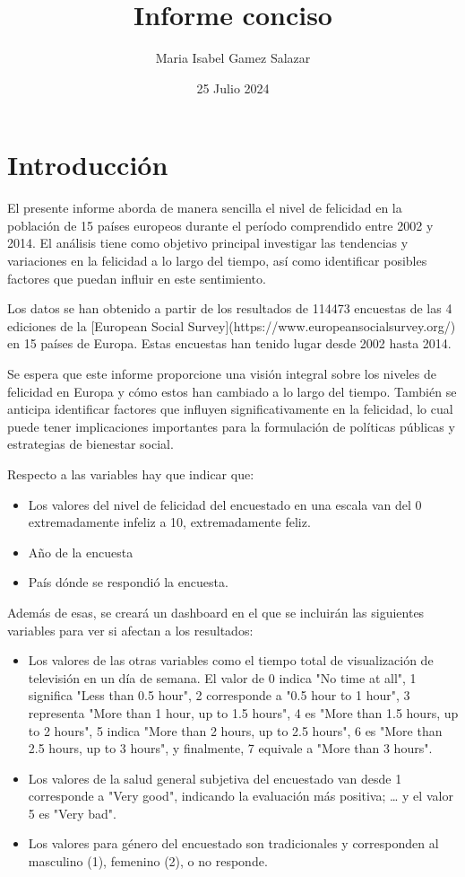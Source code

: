 \documentclass{article}
\title{Informe conciso}
\author {Maria Isabel Gamez Salazar}
\date {25 Julio 2024}
\begin{document}

\maketitle
\section {Introducción}


\noindent El presente informe aborda de manera sencilla el nivel de felicidad en la población de 15 países europeos durante el período comprendido entre 2002 y 2014. El análisis tiene como objetivo principal investigar las tendencias y variaciones en la felicidad a lo largo del tiempo, así como identificar posibles factores que puedan influir en este sentimiento.


Los datos se han obtenido a partir de los resultados de 114473 encuestas de las 4 ediciones de la [European Social Survey](https://www.europeansocialsurvey.org/) en 15 países de Europa. Estas encuestas han tenido lugar desde 2002 hasta 2014.


Se espera que este informe proporcione una visión integral sobre los niveles de felicidad en Europa y cómo estos han cambiado a lo largo del tiempo. También se anticipa identificar factores que influyen significativamente en la felicidad, lo cual puede tener implicaciones importantes para la formulación de políticas públicas y estrategias de bienestar social.


Respecto a las variables hay que indicar que:
\begin{itemize}
\item Los valores del nivel de felicidad del encuestado en una escala van del 0 extremadamente infeliz a 10, extremadamente feliz. 
\item Año de la encuesta
\item País dónde se respondió la encuesta.
\end{itemize}

Además de esas, se creará un dashboard en el que se incluirán las siguientes variables para ver si afectan a los resultados:

\begin{itemize}

\item Los valores de las otras variables como el tiempo total de visualización de televisión en un día de semana. El valor de 0 indica "No time at all", 1 significa "Less than 0.5 hour", 2 corresponde a "0.5 hour to 1 hour", 3 representa "More than 1 hour, up to 1.5 hours", 4 es "More than 1.5 hours, up to 2 hours", 5 indica "More than 2 hours, up to 2.5 hours", 6 es "More than 2.5 hours, up to 3 hours", y finalmente, 7 equivale a "More than 3 hours".

\item Los valores de la salud general subjetiva del encuestado van desde 1 corresponde a "Very good", indicando la evaluación más positiva; … y el valor 5 es "Very bad".

\item Los valores para género del encuestado son tradicionales y corresponden al masculino (1), femenino (2), o no responde.

\end{itemize}
\end{document}
